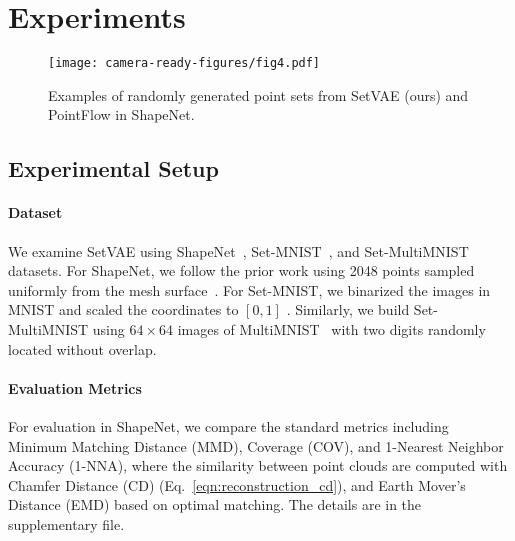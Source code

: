 \documentclass[final]{arxiv/cvpr}
\newcommand{\cutparagraphup}{\vspace*{-0.1in}}
\begin{document}
\section{Experiments}
\label{sec:experiment}

\begin{figure}[t!]
\centering
    \texttt{[image: camera-ready-figures/fig4.pdf]}
\caption{Examples of randomly generated point sets from SetVAE (ours) and PointFlow in ShapeNet. 
    }
    \label{fig:compare_pointflow}
    \vspace{-0.65cm}
\end{figure}

\subsection{Experimental Setup}
\label{sec:quantitative}

\cutparagraphup
\paragraph{Dataset}
We examine SetVAE using ShapeNet~\cite{chang2015shapenet}, Set-MNIST~\cite{zhang2020deep}, and Set-MultiMNIST~\cite{eslami2016attend} datasets.
For ShapeNet, we follow the prior work using 2048 points sampled uniformly from the mesh surface~\cite{yang2019pointflow}.
For Set-MNIST, we binarized the images in MNIST and scaled the coordinates to $[0, 1]$ \cite{kosiorek2020conditional}.
Similarly, we build Set-MultiMNIST using $64\times64$ images of MultiMNIST~\cite{eslami2016attend} with two digits randomly located without overlap.

\cutparagraphup
\paragraph{Evaluation Metrics}
For evaluation in ShapeNet, we compare the standard metrics including Minimum Matching Distance (MMD), Coverage (COV), and 1-Nearest Neighbor Accuracy (1-NNA), where the similarity between point clouds are computed with Chamfer Distance (CD) (Eq.~\eqref{eqn:reconstruction_cd}), and Earth Mover's Distance (EMD) based on optimal matching.
The details are in the supplementary file.
\end{document}
